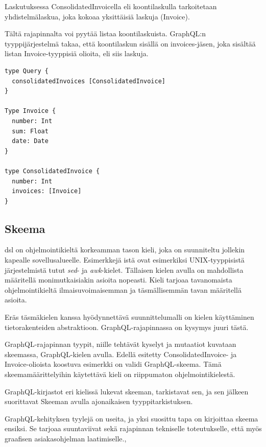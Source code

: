 Laskutuksessa ConsolidatedInvoicella eli koontilaskulla tarkoitetaan
yhdistelmälaskua, joka kokoaa yksittäisiä laskuja (Invoice).

Tältä rajapinnalta voi pyytää listaa koontilaskuista. GraphQL:n
tyyppijärjestelmä takaa, että koontilaskun sisällä on invoices-jäsen,
joka sisältää listan Invoice-tyyppisiä olioita, eli siis laskuja.

\begin{verbatim}
type Query {
  consolidatedInvoices [ConsolidatedInvoice]
}

Type Invoice {
  number: Int
  sum: Float
  date: Date
}

type ConsolidatedInvoice {
  number: Int
  invoices: [Invoice]
}
\end{verbatim}

\hypertarget{skeema}{%
\subsection{Skeema}\label{skeema}}

\Gls{dsl} on ohjelmointikieltä korkeamman tason kieli, joka on
suunniteltu jollekin kapealle sovellusalueelle.\cite{landin1966next}
Esimerkkejä istä ovat esimerkiksi UNIX-tyyppisistä
järjestelmistä tutut \emph{sed}- ja \emph{awk}-kielet. Tällaisen kielen
avulla on mahdollista määritellä monimutkaisiakin asioita
nopeasti.\cite{Raymond2003} Kieli tarjoaa tavanomaista ohjelmointikieltä
ilmaisuvoimaisemman ja täsmällisemmän tavan määritellä asioita.

Eräs täsmäkielen kanssa hyödynnettävä suunnittelumalli on kielen
käyttäminen tietorakenteiden abstraktioon.\cite{Spi00b}
GraphQL-rajapinnassa on kysymys juuri tästä.

GraphQL-rajapinnan tyypit, niille tehtävät kyselyt ja mutaatiot kuvataan
skeemassa, GraphQL-kielen avulla. Edellä esitetty ConsolidatedInvoice-
ja Invoice-olioista koostuva esimerkki on validi GraphQL-skeema. Tämä
skeemamäärittelyihin käytettävä kieli on riippumaton
ohjelmointikielestä.

GraphQL-kirjastot eri kielissä lukevat skeeman, tarkistavat sen, ja sen
jälkeen suorittavat Skeeman avulla ajonaikaisen tyyppitarkistuksen.

GraphQL-kehityksen tyylejä on useita, ja yksi suosittu tapa on
kirjoittaa skeema ensiksi. Se tarjoaa suuntaviivat sekä rajapinnan
tekniselle toteutukselle, että myös graafisen asiakasohjelman
laatimiselle.\cite{SchemaDriven2017Nov},\cite{SchemaDrivenDesign2021Jul}

